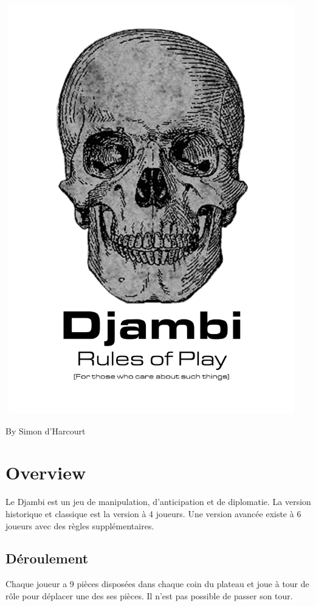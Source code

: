 \documentclass{article}
\begin{document}
\includegraphics[width=5in,height=7in]{media/image1.png}
\begin{center}
By Simon d'Harcourt
\end{center}
\newpage


\section{Overview}
Le Djambi est un jeu de manipulation, d'anticipation et de diplomatie.
La version historique et classique est la version à 4 joueurs.
Une version avancée existe à 6 joueurs avec des règles supplémentaires.


\subsection{Déroulement}
Chaque joueur a 9 pièces disposées dans chaque coin du plateau et joue à tour de rôle pour déplacer une des ses pièces.
Il n'est pas possible de passer son tour.
\end{document}
